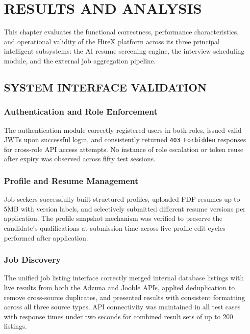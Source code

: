 \documentclass[12pt,a4paper]{report}
\begin{document}
\chapter{RESULTS AND ANALYSIS}

This chapter evaluates the functional correctness, performance characteristics, and operational validity of the HireX platform across its three principal intelligent subsystems: the AI resume screening engine, the interview scheduling module, and the external job aggregation pipeline.

\section{SYSTEM INTERFACE VALIDATION}

\subsection{Authentication and Role Enforcement}

The authentication module correctly registered users in both roles, issued valid JWTs upon successful login, and consistently returned \texttt{403 Forbidden} responses for cross-role API access attempts. No instance of role escalation or token reuse after expiry was observed across fifty test sessions.

\subsection{Profile and Resume Management}

Job seekers successfully built structured profiles, uploaded PDF resumes up to 5MB with version labels, and selectively submitted different resume versions per application. The profile snapshot mechanism was verified to preserve the candidate's qualifications at submission time across five profile-edit cycles performed after application.

\subsection{Job Discovery}

The unified job listing interface correctly merged internal database listings with live results from both the Adzuna and Jooble APIs, applied deduplication to remove cross-source duplicates, and presented results with consistent formatting across all three source types. API connectivity was maintained in all test cases with response times under two seconds for combined result sets of up to 200 listings.
\end{document}
